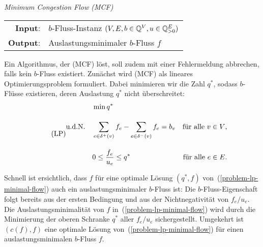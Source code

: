 \begin{centering}
	\begin{framed}
		\emph{Minimum Congestion Flow (MCF)} \\[1em]
		\begin{tabular}{rl}
			{\bfseries Input}: &$b$-Fluss-Instanz $(V, E, b\in\mathbb{Q}^V, u \in \mathbb{Q}^E_{>0})$\\
			{\bfseries Output}: &Auslastungsminimaler $b$-Fluss $f$
		\end{tabular}
	\end{framed}
\end{centering}

Ein Algorithmus, der (MCF) löst, soll zudem mit einer Fehlermeldung abbrechen, falls kein $b$-Fluss existiert.
Zunächst wird (MCF) als lineares Optimierungsproblem formuliert.
Dabei minimieren wir die Zahl $q^*$, sodass $b$-Flüsse existieren, deren Auslastung $q^*$ nicht überschreitet:
\begin{equation}\tag{LP}\label{problem-lp-minimal-flow}
\begin{aligned}
& \min q^* \\[1em]
\text{u.d.N.\quad} & \sum_{e\in \delta^+(v)} f_e - \sum_{e\in\delta^-(v)} f_e = b_v & \text{für alle $v\in V$,} \\[1em]
& 0 \leq \frac{f_e}{u_e} \leq q^* & \text{für alle $e\in E$.}
\end{aligned}
\end{equation}

Schnell ist ersichtlich, dass $f$ für eine optimale Lösung $(q^*, f)$ von~(\ref{problem-lp-minimal-flow}) auch ein auslastungsminimaler $b$-Fluss ist: Die $b$-Fluss-Eigenschaft folgt bereits aus der ersten Bedingung und aus der Nichtnegativität von $f_e / u_e$.
Die Auslastungsminimalität von $f$ in~(\ref{problem-lp-minimal-flow}) wird durch die Minimierung der oberen Schranke $q^*$ aller $f_e / u_e$ sichergestellt.
Umgekehrt ist $(c(f), f)$ eine optimale Lösung von~(\ref{problem-lp-minimal-flow}) für einen auslastungsminimalen $b$-Fluss $f$.



